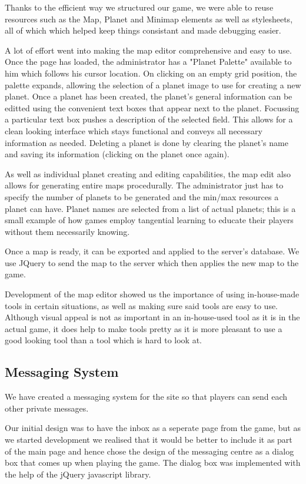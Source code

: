 \documentclass[a4paper,11pt]{article}
\begin{document}
		Thanks to the efficient way we structured our game, we were able to reuse resources such as the Map, Planet and Minimap elements as well as stylesheets, all of which which helped keep things consistant and made debugging easier.

		A lot of effort went into making the map editor comprehensive and easy to use. Once the page has loaded, the administrator has a "Planet Palette" available to him which follows his cursor location. On clicking on an empty grid position, the palette expands, allowing the selection of a planet image to use for creating a new planet. Once a planet has been created, the planet's general information can be editted using the convenient text boxes that appear next to the planet. Focussing a particular text box pushes a description of the selected field. This allows for a clean looking interface which stays functional and conveys all necessary information as needed. Deleting a planet is done by clearing the planet's name and saving its information (clicking on the planet once again).

		As well as individual planet creating and editing capabilities, the map edit also allows for generating entire maps procedurally. The administrator just has to specify the number of planets to be generated and the min/max resources a planet can have. Planet names are selected from a list of actual planets; this is a small example of how games employ tangential learning to educate their players without them necessarily knowing.

		Once a map is ready, it can be exported and applied to the server's database. We use JQuery to send the map to the server which then applies the new map to the game.

		Development of the map editor showed us the importance of using in-house-made tools in certain situations, as well as making sure said tools are easy to use. Although visual appeal is not as important in an in-house-used tool as it is in the actual game, it does help to make tools pretty as it is more pleasant to use a good looking tool than a tool which is hard to look at.
		
		\subsection{Messaging System}
		We have created a messaging system for the site so that players can send each other private messages.

		Our initial design was to have the inbox as a seperate page from the game, but as we started development we realised that it would be better to include it as part of the main page and hence chose the design of the messaging centre as a dialog box that comes up when playing the game.
		The dialog box was implemented with the help of the jQuery javascript library.
\end{document}
